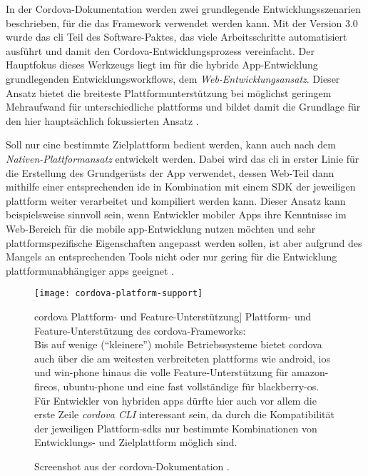 In der Cordova-Dokumentation werden zwei grundlegende Entwicklungsszenarien beschrieben, für die das Framework verwendet werden kann. 
Mit der Version 3.0 wurde das \gls{cli} Teil des Software-Paktes, das viele Arbeitsschritte automatisiert ausführt und damit den Cordova-Entwicklungsprozess vereinfacht. 
Der Hauptfokus dieses Werkzeugs liegt im für die hybride App-Entwicklung grundlegenden Entwicklungsworkflows, dem \emph{Web-Ent\-wick\-lungs\-an\-satz}. %
Dieser Ansatz bietet die breiteste Plattformunterstützung bei möglichst geringem Mehraufwand für unterschiedliche \glspl{plattform} und bildet damit die Grundlage für den hier hauptsächlich fokussierten Ansatz \cite{Cordova-Docs_CLI}.

Soll nur eine bestimmte Zielplattform bedient werden, kann auch nach dem \emph{Nativen-Plattformansatz} entwickelt werden.
Dabei wird das \gls{cli} in erster Linie für die Erstellung des Grundgerüsts der App verwendet, dessen Web-Teil dann mithilfe einer entsprechenden \gls{ide} in Kombination mit einem SDK der jeweiligen \gls{plattform} weiter verarbeitet und kompiliert werden kann. 
Dieser Ansatz kann beispielsweise sinnvoll sein, wenn Entwickler mobiler Apps ihre Kenntnisse im Web-Bereich für die mobile \gls{app}-Entwicklung nutzen möchten und sehr plattformspezifische Eigenschaften angepasst werden sollen, ist aber aufgrund des Mangels an entsprechenden Tools nicht oder nur gering für die Entwicklung plattformunabhängiger \glspl{app} geeignet \cite{Cordova-Docs_CLI}. 


\begin{figure}[h!]
\centering
\texttt{[image: cordova-platform-support]}
	\caption
	[\gls{cordova} Plattform- und Feature-Unterstützung]
	{Plattform- und Feature-Unterstützung des \gls{cordova}-Frameworks: \\ 
	Bis auf wenige (\enquote{kleinere}) mobile Betriebssysteme bietet \gls{cordova} auch über die am weitesten verbreiteten \glspl{plattform} wie \gls{android}, \gls{ios} und \gls{win-phone} hinaus die volle Feature-Unterstützung für \gls{amazon-fireos}, \gls{ubuntu-phone} und eine fast vollständige für \gls{blackberry-os}.\\
	Für Entwickler von hybriden \glspl{app} dürfte hier auch vor allem die erste Zeile \emph{cordova CLI} interessant sein, da durch die Kompatibilität der jeweiligen Plattform-\glspl{sdk} nur bestimmte Kombinationen von Entwicklungs- und Zielplattform möglich sind.
	}
	\label{fig:cordova-platform-support}
		\imagesourcefont
		\vspace{\imagesourcespace}
		\imagesourcefont{}
		\caption*{\imagesourcelabel Screenshot aus der \gls{cordova}-Dokumentation \cite{Cordova-Docs_Platform-Support}.}
\end{figure}


